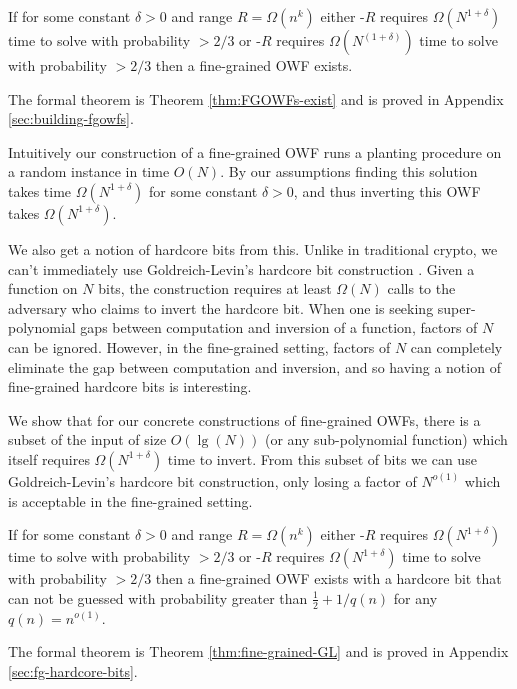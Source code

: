 \begin{theorem}
	If for some constant $\delta>0$ and range $R = \Omega(n^k)$ either \kSum-$R$ requires $\Omega(N^{1+\delta})$ time to solve with probability $>2/3$ or \zkclique-$R$ requires $\Omega(N^{(1+\delta)})$ time to solve with probability $>2/3$  then a fine-grained OWF exists.
\end{theorem}
The formal theorem is Theorem \ref{thm:FGOWFs-exist} and is proved in Appendix \ref{sec:building-fgowfs}.

Intuitively our construction of a fine-grained OWF runs a planting procedure on a random instance in time $O(N)$. By our assumptions finding this solution takes time $\Omega(N^{1+\delta})$ for some constant $\delta > 0$, and thus inverting this OWF takes $\Omega(N^{1+\delta})$.

We also get a notion of hardcore bits from this. Unlike in traditional crypto, we can't immediately use Goldreich-Levin's hardcore bit construction \cite{hardCoreBitsAndXorLemmaFromGL}. Given a function on $N$ bits, the construction requires at least $\Omega(N)$ calls to the adversary who claims to invert the hardcore bit. When one is seeking super-polynomial gaps between computation and inversion of a function, factors of $N$ can be ignored. However, in the fine-grained setting, factors of $N$ can completely eliminate the gap between computation and inversion, and so having a notion of fine-grained hardcore bits is interesting.

We show that for our concrete constructions of fine-grained OWFs, there is a subset of the input of size $O(\lg(N))$ (or any sub-polynomial function) which itself requires $\Omega(N^{1+\delta})$ time to invert. From this subset of bits we can use Goldreich-Levin's hardcore bit construction, only losing a factor of $N^{o(1)}$ which is acceptable in the fine-grained setting.

\begin{theorem}
	If for some constant $\delta>0$ and range $R = \Omega(n^k)$ either \kSum-$R$ requires $\Omega(N^{1+\delta})$ time to solve with probability $>2/3$ or \zkclique-$R$ requires $\Omega(N^{1+\delta})$ time to solve with probability $>2/3$  then a fine-grained OWF exists with a hardcore bit that can not be guessed with probability greater than $\frac 1 2 +1/q(n)$ for any $q(n) = n^{o(1)}$.
\end{theorem}
The formal theorem is Theorem \ref{thm:fine-grained-GL} and is proved in Appendix \ref{sec:fg-hardcore-bits}.

